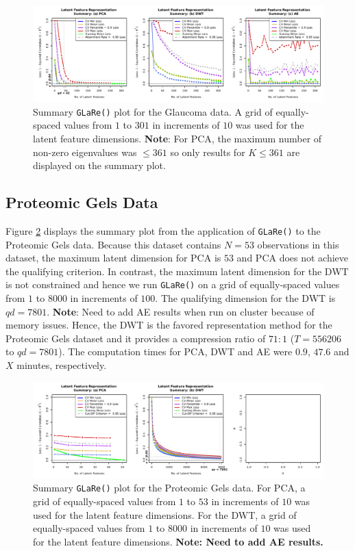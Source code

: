 \begin{figure}
    \centering
    \includegraphics[width=1\textwidth]{figures/eye-results.pdf}
    \caption{Summary \texttt{GLaRe()} plot for the Glaucoma data. A grid of equally-spaced values from $1$ to $301$ in increments of $10$ was used for the latent feature dimensions. \textbf{Note}: For PCA, the maximum number of non-zero eigenvalues was $\leq361$ so only results for $K \leq 361$ are displayed on the summary plot.}
    \label{fig:eye-results}
\end{figure}

\subsection{Proteomic Gels Data}\label{sec:gels-reults}

Figure \ref{fig:gels-results} displays the summary plot from the application of \texttt{GLaRe()} to the Proteomic Gels data.
Because this dataset contains $N=53$ observations in this dataset, the maximum latent dimension for PCA is $53$ and PCA does not achieve the qualifying criterion.
In contrast, the maximum latent dimension for the DWT is not constrained and hence we run \texttt{GLaRe()} on a grid of equally-spaced values from $1$ to $8000$ in increments of $100$.
The qualifying dimension for the DWT is $qd=7801$.
{\color{purple}\textbf{Note}: Need to add AE results when run on cluster because of memory issues.}
Hence, the DWT is the favored representation method for the Proteomic Gels dataset and it provides a compression ratio of $71:1$ ($T = 556206$ to $qd = 7801$).
The computation times for PCA, DWT and AE were $0.9$, $47.6$ and {\color{purple}$X$} minutes, respectively.


\begin{figure}
    \centering
    \includegraphics[width=1\linewidth]{figures/gels-results.pdf}
    \caption{Summary \texttt{GLaRe()} plot for the Proteomic Gels data. For PCA, a grid of equally-spaced values from $1$ to $53$ in increments of $10$ was used for the latent feature dimensions.
    For the DWT,  a grid of equally-spaced values from $1$ to $8000$ in increments of $10$ was used for the latent feature dimensions. {\color{purple} \textbf{Note: Need to add AE results.}}}
    \label{fig:gels-results}
\end{figure}


